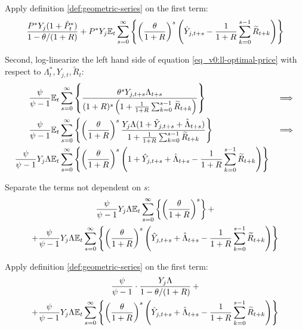 \documentclass[../thesis.tex]{subfiles}
\begin{document}
	Apply definition \ref{def:geometric-series} on the first term:
	\begin{align}
		\frac{ P^\ast Y_{j} ( 1 + \hat{P}_t^\ast ) }{1-\theta /(1+R)} + P^\ast Y_{j} {\mathbb{E}_{t}} \sum_{s=0}^{\infty} \left\{ \left( \frac{\theta}{1 + R} \right)^s \left( \hat{Y}_{j,t+s} - \frac{1}{1 + R} \sum_{k=0}^{s-1} \widetilde{R}_{t+k} \right) \right\} \nonumber
	\end{align}
	
	Second, log-linearize the left hand side of equation \ref{eq_v0:ll-optimal-price} with respect to \( \Lambda_t^\ast, Y_{j,t}, \widetilde{R}_t \):
	\begin{alignat}{2}
		\frac{\psi}{\psi-1} &{\mathbb{E}_{t}} \sum_{s=0}^{\infty} \left\{ \frac{\theta^s Y_{j,t+s} \Lambda_{t+s}}{ (1 + R)^s \left( 1 + \frac{1}{1 + R} \sum_{k=0}^{s-1} \widetilde{R}_{t+k} \right) } \right\} & \implies \nonumber \\
		\frac{\psi}{\psi-1} &{\mathbb{E}_{t}} \sum_{s=0}^{\infty} \left\{ \left( \frac{\theta}{1 + R} \right)^s \frac{ Y_{j} \Lambda (1+ \hat{Y}_{j,t+s} + \hat{\Lambda}_{t+s}) }{ 1 + \frac{1}{1 + R} \sum_{k=0}^{s-1} \widetilde{R}_{t+k} } \right\} & \implies \nonumber \\
		\frac{\psi}{\psi-1} Y_{j} \Lambda &{\mathbb{E}_{t}} \sum_{s=0}^{\infty} \left\{ \left( \frac{\theta}{1 + R} \right)^s \left( 1+ \hat{Y}_{j,t+s} + \hat{\Lambda}_{t+s} - \frac{1}{1 + R} \sum_{k=0}^{s-1} \widetilde{R}_{t+k} \right) \right\} & \nonumber
	\end{alignat}
	
	Separate the terms not dependent on $s$:
	\begin{multline}
		\frac{\psi}{\psi-1} Y_{j} \Lambda {\mathbb{E}_{t}} \sum_{s=0}^{\infty} \left\{ \left( \frac{\theta}{1 + R} \right)^s \right\} + 
		\\
		+ \frac{\psi}{\psi-1} Y_{j} \Lambda {\mathbb{E}_{t}} \sum_{s=0}^{\infty} \left\{ \left( \frac{\theta}{1 + R} \right)^s \left( \hat{Y}_{j,t+s} + \hat{\Lambda}_{t+s} - \frac{1}{1 + R} \sum_{k=0}^{s-1} \widetilde{R}_{t+k} \right) \right\} \nonumber
	\end{multline}
	
	Apply definition \ref{def:geometric-series} on the first term:
	\begin{multline}
		\frac{\psi}{\psi-1} \cdot \frac{Y_{j} \Lambda}{1-\theta /(1+R)} \, + 
		\\
		+ \frac{\psi}{\psi-1} Y_{j} \Lambda {\mathbb{E}_{t}} \sum_{s=0}^{\infty} \left\{ \left( \frac{\theta}{1 + R} \right)^s \left( \hat{Y}_{j,t+s} + \hat{\Lambda}_{t+s} - \frac{1}{1 + R} \sum_{k=0}^{s-1} \widetilde{R}_{t+k} \right) \right\} \nonumber
	\end{multline}
	
\end{document}
